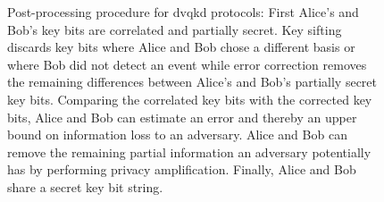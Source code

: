 \begin{figure}[htb]
	\centering
	
	\caption{Post-processing procedure for \gls{dvqkd} protocols: First Alice's and Bob's key bits are correlated and partially secret. Key sifting discards key bits where Alice and Bob chose a different basis or where Bob did not detect an event while error correction removes the remaining differences between Alice's and Bob's partially secret key bits. Comparing the correlated key bits with the corrected key bits, Alice and Bob can estimate an error and thereby an upper bound on information loss to an adversary. Alice and Bob can remove the remaining partial information an adversary potentially has by performing privacy amplification. Finally, Alice and Bob share a secret key bit string.}
\end{figure}
\cite{Duvsek2006} %
